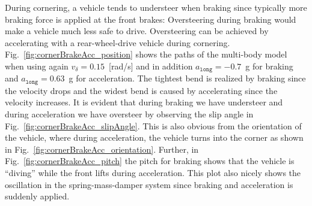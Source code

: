 \documentclass[11pt,a4paper]{article}
\renewcommand{\^}[1]{^{(#1)}}
\begin{document}
During cornering, a vehicle tends to understeer when braking since typically more braking force is applied at the front brakes: Oversteering during braking would make a vehicle much less safe to drive. Oversteering can be achieved by accelerating with a rear-wheel-drive vehicle during cornering. Fig.~\ref{fig:cornerBrakeAcc_position} shows the paths of the multi-body model when using again $v_\delta = 0.15$~[rad/s] and in addition $a_\mathtt{long} = -0.7$~g for braking and $a_\mathtt{long} = 0.63$~g for acceleration. The tightest bend is realized by braking since the velocity drops and the widest bend is caused by accelerating since the velocity increases. It is evident that during braking we have understeer and during acceleration we have oversteer by observing the slip angle in Fig.~\ref{fig:cornerBrakeAcc_slipAngle}. This is also obvious from the orientation of the vehicle, where during acceleration, the vehicle turns into the corner as shown in Fig.~\ref{fig:cornerBrakeAcc_orientation}. Further, in Fig.~\ref{fig:cornerBrakeAcc_pitch} the pitch for braking shows that the vehicle is ``diving'' while the front lifts during acceleration. This plot also nicely shows the oscillation in the spring-mass-damper system since braking and acceleration is suddenly applied.
\end{document}
